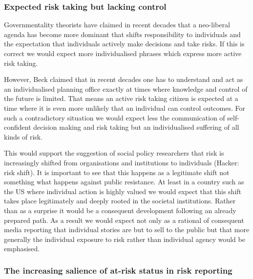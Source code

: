 \subsubsection*{Expected risk taking but lacking control}

Governmentality theorists have claimed in recent decades that a neo-liberal agenda has become more dominant that shifts responsibility to individuals and the expectation that individuals actively make decisions and take risks. If this is correct we would expect more individualised phrases which express more active risk taking. 

However, Beck claimed that in recent decades one has to understand and act as an individualised planning office exactly at times where knowledge and control of the future is limited. That means an active risk taking citizen is expected at a time where it is even more unlikely that an individual can control outcomes. For such a contradictory situation we would expect less the communication of self-confident decision making and risk taking but an individualised suffering of all kinds of risk. 

This would support the suggestion of social policy researchers that risk is increasingly shifted from organisations and institutions to individuals (Hacker: risk shift). It is important to see that this happens as a legitimate shift not something what happens against public resistance. At least in a country such as the US where individual action is highly valued we would expect that this shift takes place legitimately and deeply rooted in the societal institutions. Rather than as a surprise it would be a consequent development following an already prepared path. As a result we would expect not only as a rational of consequent media reporting that individual stories are but to sell to the public but that more generally the individual exposure to risk rather than individual agency would be emphasised. 

\subsubsection*{The increasing salience of at-risk status in risk reporting}

